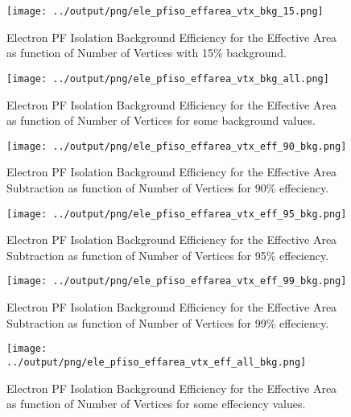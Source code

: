 \documentclass[11pt]{book}
\begin{document}
\begin{figure}[htb]
\centering
\texttt{[image: ../output/png/ele\_pfiso\_effarea\_vtx\_bkg\_15.png]}
\caption{Electron PF Isolation Background Efficiency for the Effective Area as function of Number of Vertices with 15\% background.}
\label{fig:ele_pfiso_vtx_bkg_effarea_bkg_15}
\end{figure}

\begin{figure}[htb]
\centering
\texttt{[image: ../output/png/ele\_pfiso\_effarea\_vtx\_bkg\_all.png]}
\caption{Electron PF Isolation Background Efficiency for the Effective Area as function of Number of Vertices for some background values.}
\label{fig:ele_pfiso_vtx_bkg_effarea_bkg_all}
\end{figure}

\begin{figure}[htb]
\centering
\texttt{[image: ../output/png/ele\_pfiso\_effarea\_vtx\_eff\_90\_bkg.png]}
\caption{Electron PF Isolation Background Efficiency for the Effective Area Subtraction as function of Number of Vertices for 90\% effeciency.}
\label{fig:ele_pfiso_vtx_eff_effarea_eff_90_bkg}
\end{figure}

\begin{figure}[htb]
\centering
\texttt{[image: ../output/png/ele\_pfiso\_effarea\_vtx\_eff\_95\_bkg.png]}
\caption{Electron PF Isolation Background Efficiency for the Effective Area Subtraction as function of Number of Vertices for 95\% effeciency.}
\label{fig:ele_pfiso_vtx_eff_effarea_eff_95_bkg}
\end{figure}

\begin{figure}[htb]
\centering
\texttt{[image: ../output/png/ele\_pfiso\_effarea\_vtx\_eff\_99\_bkg.png]}
\caption{Electron PF Isolation Background Efficiency for the Effective Area Subtraction as function of Number of Vertices for 99\% effeciency.}
\label{fig:ele_pfiso_vtx_eff_effarea_eff_99_bkg}
\end{figure}

\begin{figure}[htb]
\centering
\texttt{[image: ../output/png/ele\_pfiso\_effarea\_vtx\_eff\_all\_bkg.png]}
\caption{Electron PF Isolation Background Efficiency for the Effective Area as function of Number of Vertices for some effeciency values.}
\label{fig:ele_pfiso_vtx_eff_effarea_eff_all_bkg}
\end{figure}
\clearpage
\end{document}
